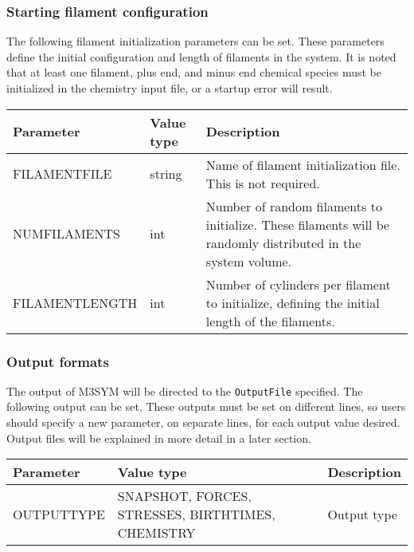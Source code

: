 \documentclass[11pt, oneside]{article}   	%
\begin{document}
\subsubsection{Starting filament configuration}

The following filament initialization parameters can be set. These parameters define the initial configuration and length
of filaments in the system. It is noted that at least one filament, plus end, and minus end chemical species must be initialized in the chemistry input file, or a startup error will result.

\begin{table} [!ht]
\centering
\begin{tabular}{|L{4cm}|C{4cm}|L{6cm}|}  
\hline
 \textbf{Parameter} & \textbf{Value type} & \textbf{Description} \\
 \hline
  FILAMENTFILE & string & Name of filament initialization file. This is not required.\\
  \hline
  NUMFILAMENTS & int & Number of random filaments to initialize. These filaments will be randomly 
  distributed in the system volume.\\
  \hline
  FILAMENTLENGTH & int & Number of cylinders per filament to initialize, defining the initial length of the filaments.\\
  \hline

\end{tabular}
\end{table}

\subsubsection{Output formats}

The output of M3SYM will be directed to the \texttt{OutputFile} specified. The following output can be set. These outputs must be set on different lines, so users should specify a new parameter, on separate lines, for each output value desired. Output files will be explained in more detail in a later section.

\begin{table} [!ht]
\centering
\begin{tabular}{|L{4cm}|C{6cm}|L{4cm}|}  
\hline
 \textbf{Parameter} & \textbf{Value type} & \textbf{Description} \\
 \hline
  OUTPUTTYPE & SNAPSHOT, FORCES, STRESSES, BIRTHTIMES, CHEMISTRY & Output type\\
  \hline
 
\end{tabular}
\end{table}
\end{document}

